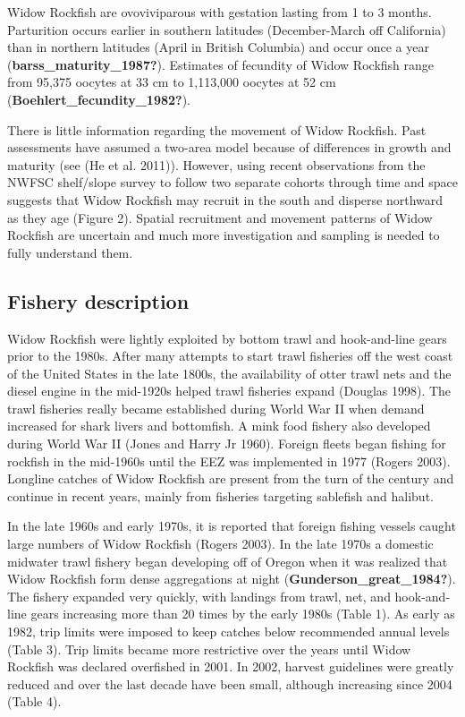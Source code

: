 \documentclass[
]{scrartcl}
\begin{document}
Widow Rockfish are ovoviviparous with gestation lasting from 1 to 3
months. Parturition occurs earlier in southern latitudes (December-March
off California) than in northern latitudes (April in British Columbia)
and occur once a year (\textbf{barss\_maturity\_1987?}). Estimates of
fecundity of Widow Rockfish range from 95,375 oocytes at 33 cm to
1,113,000 oocytes at 52 cm (\textbf{Boehlert\_fecundity\_1982?}).

There is little information regarding the movement of Widow Rockfish.
Past assessments have assumed a two-area model because of differences in
growth and maturity (see (He et al. 2011)). However, using recent
observations from the NWFSC shelf/slope survey to follow two separate
cohorts through time and space suggests that Widow Rockfish may recruit
in the south and disperse northward as they age (Figure 2). Spatial
recruitment and movement patterns of Widow Rockfish are uncertain and
much more investigation and sampling is needed to fully understand them.

\subsection{Fishery description}\label{fishery-description}

Widow Rockfish were lightly exploited by bottom trawl and hook-and-line
gears prior to the 1980s. After many attempts to start trawl fisheries
off the west coast of the United States in the late 1800s, the
availability of otter trawl nets and the diesel engine in the mid-1920s
helped trawl fisheries expand (Douglas 1998). The trawl fisheries really
became established during World War II when demand increased for shark
livers and bottomfish. A mink food fishery also developed during World
War II (Jones and Harry Jr 1960). Foreign fleets began fishing for
rockfish in the mid-1960s until the EEZ was implemented in 1977 (Rogers
2003). Longline catches of Widow Rockfish are present from the turn of
the century and continue in recent years, mainly from fisheries
targeting sablefish and halibut.

In the late 1960s and early 1970s, it is reported that foreign fishing
vessels caught large numbers of Widow Rockfish (Rogers 2003). In the
late 1970s a domestic midwater trawl fishery began developing off of
Oregon when it was realized that Widow Rockfish form dense aggregations
at night (\textbf{Gunderson\_great\_1984?}). The fishery expanded very
quickly, with landings from trawl, net, and hook-and-line gears
increasing more than 20 times by the early 1980s (Table 1). As early as
1982, trip limits were imposed to keep catches below recommended annual
levels (Table 3). Trip limits became more restrictive over the years
until Widow Rockfish was declared overfished in 2001. In 2002, harvest
guidelines were greatly reduced and over the last decade have been
small, although increasing since 2004 (Table 4).
\end{document}
